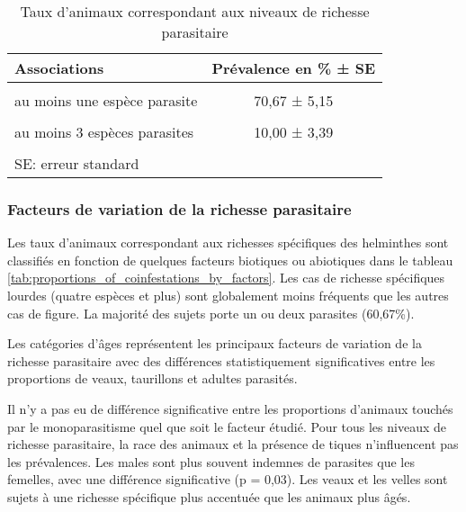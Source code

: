 \begin{table}[!h]
	
	\caption{\label{tab:prevalences_coinfestations}Taux d'animaux correspondant aux niveaux de richesse parasitaire}
	\centering
	\begin{tabular}[t]{lc}
		\toprule
		\textbf{Associations} & \textbf{Prévalence en \% ± SE}\\
		\midrule
		\cellcolor{gray!6}{aucune espèce parasite} & \cellcolor{gray!6}{29,33 ± 5,15}\\
		au moins une espèce parasite & 70,67 ± 5,15\\
		\cellcolor{gray!6}{au moins 2 espèces parasites} & \cellcolor{gray!6}{42,00 ± 5,59}\\
		au moins 3 espèces parasites & 10,00 ± 3,39\\
		\cellcolor{gray!6}{au moins 4 espèces parasites} & \cellcolor{gray!6}{3,00 ± 1,93}\\
		\midrule
		\multicolumn{2}{l}{SE: erreur standard}\\
		\bottomrule
	\end{tabular}
\end{table}


\subsubsection{Facteurs de variation de la richesse parasitaire}
Les taux d'animaux correspondant aux richesses spécifiques des helminthes sont classifiés en fonction de quelques facteurs biotiques ou abiotiques dans le tableau \ref{tab:proportions_of_coinfestations_by_factors}. Les cas de richesse spécifiques lourdes (quatre espèces et plus) sont globalement moins fréquents que les autres cas de figure. La majorité des sujets porte un ou deux parasites (60,67\%). 
\par Les catégories d'âges représentent les principaux facteurs de variation de la richesse parasitaire avec des différences statistiquement significatives entre les proportions de veaux, taurillons et adultes parasités.
\par Il n'y a pas eu de différence significative entre les proportions d'animaux touchés par le monoparasitisme quel que soit le facteur étudié. Pour tous les niveaux de richesse parasitaire, la race des animaux et la présence de tiques n'influencent pas les prévalences. Les males sont plus souvent indemnes de parasites que les femelles, avec une différence significative (p = 0,03). Les veaux et les velles sont sujets à une richesse spécifique plus accentuée que les animaux plus âgés.

